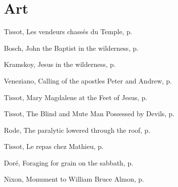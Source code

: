 \documentclass[10pt,twoside]{article} %
\newcommand{\artcredit}[3]{#2, #3, p.~\pageref{fig:#1}}
\begin{document}
\vfill

\vfill\pagebreak\section*{Art}
\artcredit{cleansing-temple}{Tissot}{Les vendeurs chassés du Temple}

\artcredit{john-in-the-wilderness}{Bosch}{John the Baptist in the wilderness}

\artcredit{jesus-in-wilderness}{Kramskoy}{Jesus in the wilderness}

\artcredit{fishers-of-men}{Veneziano}{Calling of the apostles Peter and Andrew}

\artcredit{mary-magdalene-at-the-feet-of-jesus}{Tissot}{Mary Magdalene at the Feet of Jesus}

\artcredit{driving-out-demons}{Tissot}{The Blind and Mute Man Possessed by Devils}

\artcredit{healing-the-paralytic}{Rode}{The paralytic lowered through the roof}

\artcredit{meal-in-house-of-matthew}{Tissot}{Le repas chez Mathieu}

\artcredit{plucking-corn-on-the-sabbath}{Doré}{Foraging for grain on the sabbath}

\artcredit{good-samaritan}{Nixon}{Monument to William Bruce Almon}
\end{document}
